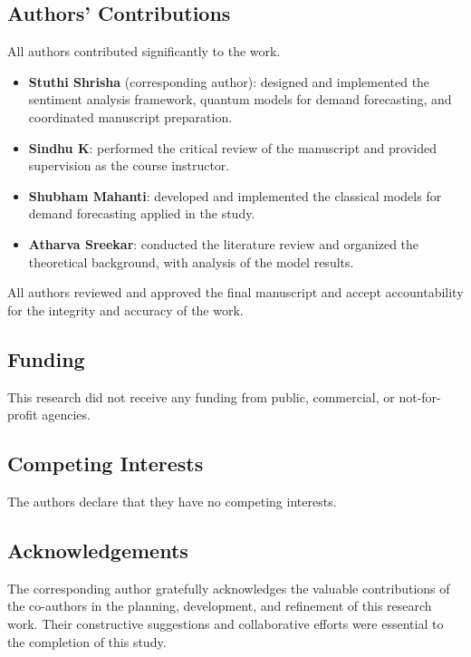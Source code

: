 \documentclass[pdflatex,sn-mathphys-num]{sn-jnl}%
\begin{document}
\subsection*{Authors’ Contributions}
All authors contributed significantly to the work.
\begin{itemize}
    \item \textbf{Stuthi Shrisha} (corresponding author): designed and implemented the sentiment analysis framework, quantum models for demand forecasting, and coordinated manuscript preparation.
    \item \textbf{Sindhu K}: performed the critical review of the manuscript and provided supervision as the course instructor.
    \item \textbf{Shubham Mahanti}: developed and implemented the classical models for demand forecasting applied in the study.
    \item \textbf{Atharva Sreekar}: conducted the literature review and organized the theoretical background, with analysis of the model results.
\end{itemize}
All authors reviewed and approved the final manuscript and accept accountability for the integrity and accuracy of the work.

\subsection*{Funding}
This research did not receive any funding from public, commercial, or not-for-profit agencies.

\subsection*{Competing Interests}
The authors declare that they have no competing interests.

\subsection*{Acknowledgements}
The corresponding author gratefully acknowledges the valuable contributions of the co-authors in the planning, development, and refinement of this research work. Their constructive suggestions and collaborative efforts were essential to the completion of this study.
\end{document}
